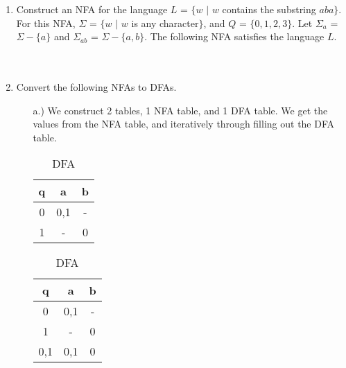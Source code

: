 \documentclass[12pt]{article}
\begin{document}
\begin{enumerate}
\item Construct an NFA for the language $L$ = $\{w $ $|$ $w$ contains the substring $aba\}$. \\

For this NFA, $\Sigma$ = $\{w $ $|$ $w$ is any character$ \}$, and $Q$ = $\{0 ,1, 2, 3\}$. Let $\Sigma_a$ = $\Sigma - \{a\}$ and $\Sigma_{ab}$ = $\Sigma - \{a, b\}$. The following NFA satisfies the language $L$. \\ \\ \\

	\pagebreak
	
	\item Convert the following NFAs to DFAs.
		\begin{itemize}
			\item[a.)] We construct 2 tables, 1 NFA table, and 1 DFA table. We get the values from the NFA table, and iteratively through filling out the DFA table.\\

\begin{table}[!htb]
    \caption{NFA to DFA}
    \begin{minipage}{.5\linewidth}
      \caption{NFA}
      \centering
        \begin{tabular}{c c c}
           q & a & b \\ \hline
	0 & 0,1 & - \\
	1 & - & 0  \\	
        \end{tabular}
    \end{minipage}%
    \begin{minipage}{.5\linewidth}
      \centering
        \caption{DFA}
        \begin{tabular}{c c c}
           q & a & b \\ \hline
	0 & 0,1 & - \\
	1 & - & 0  \\
	0,1 & 0,1 & 0 \\	
        \end{tabular}
    \end{minipage} 
\end{table}
	

\end{itemize}
\end{enumerate}
\end{document}
